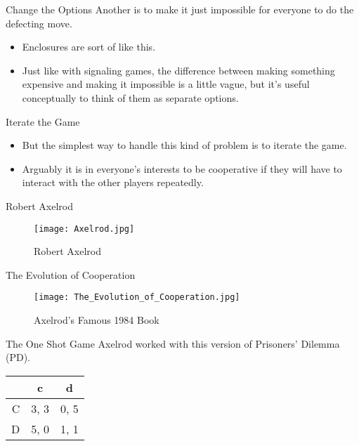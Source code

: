\documentclass[
  ignorenonframetext,
]{beamer}
\providecommand{\tightlist}{%
  \setlength{\itemsep}{0pt}\setlength{\parskip}{0pt}}
\begin{document}
\begin{frame}{Change the Options}
\protect\hypertarget{change-the-options}{}
Another is to make it just impossible for everyone to do the defecting
move.

\begin{itemize}
\tightlist
\item
  Enclosures are sort of like this.
\item
  Just like with signaling games, the difference between making
  something expensive and making it impossible is a little vague, but
  it's useful conceptually to think of them as separate options.
\end{itemize}
\end{frame}

\begin{frame}{Iterate the Game}
\protect\hypertarget{iterate-the-game}{}
\begin{itemize}
\tightlist
\item
  But the simplest way to handle this kind of problem is to iterate the
  game.
\item
  Arguably it is in everyone's interests to be cooperative if they will
  have to interact with the other players repeatedly.
\end{itemize}
\end{frame}

\begin{frame}{Robert Axelrod}
\protect\hypertarget{robert-axelrod}{}
\begin{figure}
\centering
\texttt{[image: Axelrod.jpg]}
\caption{Robert Axelrod}
\end{figure}
\end{frame}

\begin{frame}{The Evolution of Cooperation}
\protect\hypertarget{the-evolution-of-cooperation}{}
\begin{figure}
\centering
\texttt{[image: The\_Evolution\_of\_Cooperation.jpg]}
\caption{Axelrod's Famous 1984 Book}
\end{figure}
\end{frame}

\begin{frame}{The One Shot Game}
\protect\hypertarget{the-one-shot-game}{}
Axelrod worked with this version of Prisoners' Dilemma (PD).

\begin{table}[!h]
\centering
\begin{tabular}[t]{>{}r|cc}
\toprule
 & c & d\\
\midrule
C & 3, 3 & 0, 5\\
D & 5, 0 & 1, 1\\
\bottomrule
\end{tabular}
\end{table}
\end{frame}
\end{document}
